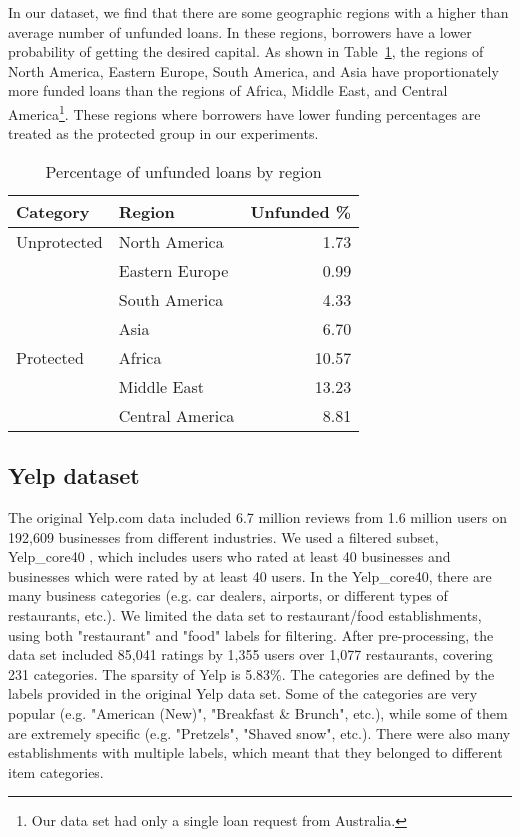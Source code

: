         In our dataset, we find that there are some geographic regions with a higher than average number of unfunded loans. In these regions, borrowers have a lower probability of getting the desired capital. As shown in Table~\ref{tab:unfunded}, the regions of North America, Eastern Europe, South America, and Asia have proportionately more funded loans than the regions of Africa, Middle East, and Central America\footnote{Our data set had only a single loan request from Australia.}. These regions where borrowers have lower funding percentages are treated as the protected group in our experiments.
        
        \begin{table}
            \centering
        \begin{tabular}{l|l|r}
            Category & Region & Unfunded \% \\ \hline
            Unprotected & North America & 1.73 \\
            & Eastern Europe & 0.99 \\
            & South America & 4.33 \\
            & Asia & 6.70 \\ \hline
            Protected & Africa & 10.57 \\
            & Middle East & 13.23 \\
            & Central America & 8.81 \\
        \end{tabular}
            \caption{Percentage of unfunded loans by region}
            \label{tab:unfunded}
        \end{table}
 


    \subsection{Yelp dataset}
    The original Yelp.com data included 6.7 million reviews from 1.6 million users on 192,609 businesses from different industries. We used a filtered subset, Yelp\_core40 \cite{mansoury2019bias}, which includes users who rated at least 40 businesses and businesses which were rated by at least 40 users. In the Yelp\_core40, there are many business categories  (e.g. car dealers, airports, or different types of restaurants, etc.). We limited the data set to restaurant/food establishments, using both "restaurant" and "food" labels for filtering. After pre-processing, the data set included 85,041 ratings by 1,355 users over 1,077 restaurants, covering 231 categories. The sparsity of Yelp is 5.83\%. The categories are defined by the labels provided in the original Yelp data set. Some of the categories are very popular (e.g. "American (New)", "Breakfast \& Brunch", etc.), while some of them are extremely specific (e.g. "Pretzels", "Shaved snow", etc.). There were also many establishments with multiple labels, which meant that they belonged to different item categories.



